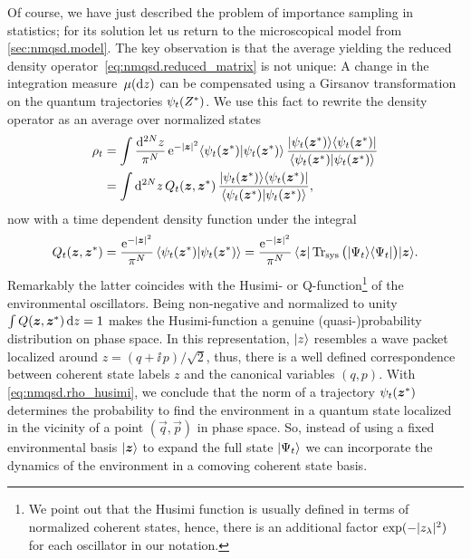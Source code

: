 Of course, we have just described the problem of importance sampling in statistics; for its solution let us return to the microscopical model from \autoref{sec:nmqsd.model}.
The key observation is that the average yielding the reduced density operator~\ref{eq:nmqsd.reduced_matrix} is not unique:
A change in the integration measure $\, \mu(\mathrm{d} z)$ can be compensated using a Girsanov transformation on the quantum trajectories $\psitZ$.
We use this fact to rewrite the density operator as an average over normalized states
\begin{align}
  \label{eq:nmqsd.rho_husimi}
  \rho_t &= \int \frac{\mathrm{d}^{2N} z}{\pi^N} \, \exp[-\abs{\zz}^2] \braket{\psitz}{\psitz} \, \frac{\ket{\psitz}\bra{\psitz}}{\braket{\psitz}{\psitz}} \\
  &= \int \mathrm{d}^{2N}z \, Q_t(\zz, \cc\zz) \, \frac{\ket{\psitz}\bra{\psitz}}{\braket{\psitz}{\psitz}},
\end{align}
now with a time dependent density function under the integral
\begin{equation}
  Q_t(\zz, \cc\zz) = \frac{\exp[-\abs{\zz}^2]}{\pi^N}\, \braket{\psitz}{\psitz}
                   = \frac{\exp[-\abs{\zz}^2]}{\pi^N}\, \bra{\zz} \Tr_\mathrm{sys} \big( \ket{\Psi_t}\bra{\Psi_t} \big)\ket{\zz}.
    \label{eq:nmqsd.husimi}
\end{equation}
Remarkably the latter coincides with the Husimi- or Q-function\footnote{%
  We point out that the Husimi function is usually defined in terms of normalized coherent states, hence, there is an additional factor $\exp(-\abs{z_\lambda}^2)$ for each oscillator in our notation.
}
of the environmental oscillators\cite{Sc11_quantum_optics}.
Being non-negative and normalized to unity $\int Q(\boldsymbol{z}, {\boldsymbol{z}}^*) \, \mathrm{d} z = 1$ makes the Husimi-function a genuine (quasi-)probability distribution on phase space.
In this representation, $| z \rangle$ resembles a wave packet localized around $z = (q + \ii \, p) / \sqrt{2}$, thus, there is a well defined correspondence between coherent state labels $z$ and the canonical variables $(q, p)$.
With \autoref{eq:nmqsd.rho_husimi}, we conclude that the norm of a trajectory $\psitz$ determines the probability to find the environment in a quantum state localized in the vicinity of a point $(\vec q, \vec p)$ in phase space.
So, instead of using a fixed environmental basis $| \boldsymbol{z} \rangle$ to expand the full state $| \Psi_t \rangle$ we can incorporate the dynamics of the environment in a comoving coherent state basis.

